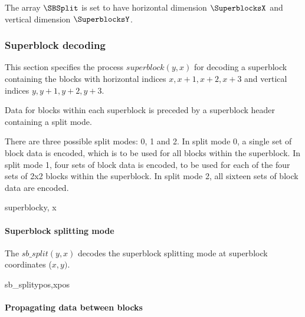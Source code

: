 The array $\SBSplit$ is set to have horizontal dimension $\SuperblocksX$ and vertical dimension $\SuperblocksY$.

\subsubsection{Superblock decoding}

\label{superblockdecoding}

This section specifies the process $superblock(y, x)$ for decoding a superblock containing
the blocks with horizontal indices $x, x+1, x+2, x+3$ and vertical indices $y, y+1, y+2, y+3$.

Data for blocks within each superblock is preceded by a superblock header containing
a split mode.

There are three possible split modes: 0, 1 and 2. In split mode 0, a single set of block data is encoded, 
which is to be used for all blocks within
the superblock. In split mode 1, four sets of block data is encoded, to be used for each of the four
sets of 2x2 blocks within the superblock. In split mode 2, all sixteen sets of block data are encoded.

\begin{pseudo}{superblock}{y, x}
   \bsEND
\bsEND
\end{pseudo}

\paragraph{Superblock splitting mode}
\label{superblocksplit}

The $sb\_split(y, x)$ decodes the superblock splitting mode at superblock coordinates ($x, y)$.

\begin{pseudo}{sb\_split}{ypos,xpos}
\end{pseudo}

\paragraph{Propagating data between blocks}
\label{propagatedata}

